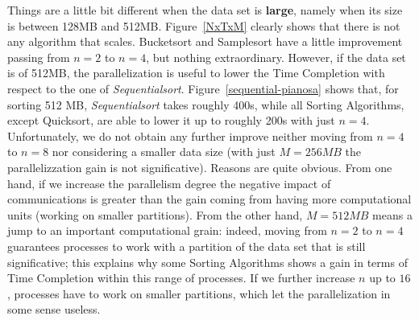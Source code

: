 Things are a little bit different when the data set is \textbf{large}, namely when its size is between 128MB and 512MB. Figure~\ref{NxTxM} clearly shows that there is not any algorithm that scales. Bucketsort and Samplesort have a little improvement passing from $n=2$ to $n=4$, but nothing extraordinary. However, if the data set is of 512MB, the parallelization is useful to lower the Time Completion with respect to the one of \textit{Sequentialsort}. Figure~\ref{sequential-pianosa} shows that, for sorting 512 MB, \textit{Sequentialsort} takes roughly 400s, while all Sorting Algorithms, except Quicksort, are able to lower it up to roughly 200s with just $n=4$. Unfortunately, we do not obtain any further improve neither moving from $n=4$ to $n=8$ nor considering a smaller data size (with just $M=256MB$ the parallelizzation gain is not significative). Reasons are quite obvious. From one hand, if we increase the parallelism degree the negative impact of communications is greater than the gain coming from having more computational units (working on smaller partitions).  From the other hand, $M=512MB$ means a jump to an important computational grain: indeed, moving from $n=2$ to $n=4$ guarantees processes to work with a partition of the data set that is still significative; this explains why some Sorting Algorithms shows a gain in terms of Time Completion within this range of processes. If we further increase $n$ up to $16$, processes have to work on smaller partitions, which let the parallelization in some sense useless.

